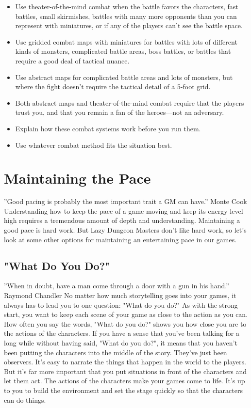 \documentclass[10pt,a4paper,twoside,bg=print,twocolumn,openany,nodeprecatedcode]{dndbook}
\begin{document}
\begin{itemize}
\item Use theater-of-the-mind combat when the battle favors the characters, fast battles, small skirmishes, battles with many more opponents than you can represent with miniatures, or if any of the players can't see the battle space.
\item Use gridded combat maps with miniatures for battles with lots of different kinds of monsters, complicated battle areas, boss battles, or battles that require a good deal of tactical nuance.
\item Use abstract maps for complicated battle areas and lots of monsters, but where the fight doesn't require the tactical detail of a 5-foot grid.
\item Both abstract maps and theater-of-the-mind combat require that the players trust you, and that you remain a fan of the heroes—not an adversary.
\item Explain how these combat systems work before you run them.
\item Use whatever combat method fits the situation best.
\end{itemize}

\section{Maintaining the Pace}
\DndQuote%
{}
{''Good pacing is probably the most important trait a GM can have.''}
{Monte Cook}
Understanding how to keep the pace of a game moving and keep its energy level high requires a tremendous amount of depth and understanding. Maintaining a good pace is hard work. But Lazy Dungeon Masters don't like hard work, so let's look at some other options for maintaining an entertaining pace in our games.
\subsection{"What Do You Do?"}
\DndQuote%
{}
{''When in doubt, have a man come through a door with a gun in his hand.''}
{Raymond Chandler}
No matter how much storytelling goes into your games, it always has to lead you to one question: "What do you do?"
As with the strong start, you want to keep each scene of your game as close to the action as you can. How often you say the words, "What do you do?" shows you how close you are to the actions of the characters. If you have a sense that you've been talking for a long while without having said, "What do you do?", it means that you haven't been putting the characters into the middle of the story. They've just been observers.
It's easy to narrate the things that happen in the world to the players. But it's far more important that you put situations in front of the characters and let them act. The actions of the characters make your games come to life. It's up to you to build the environment and set the stage quickly so that the characters can do things.
\end{document}
